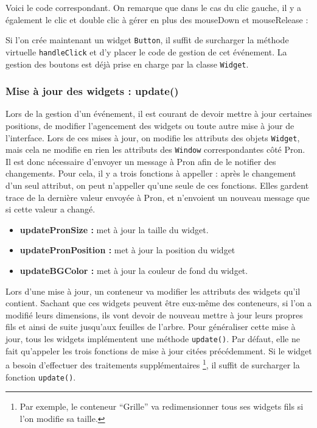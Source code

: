 Voici le code correspondant. On remarque que dans le cas du clic gauche, il y a également le clic et double clic à gérer en plus des mouseDown et mouseRelease :



Si l'on crée maintenant un widget \verb|Button|, il suffit de surcharger la méthode virtuelle \verb|handleClick| et d'y placer le code de gestion de cet événement. La gestion des boutons est déjà prise en charge par la classe \verb|Widget|.

\subsubsection{Mise à jour des widgets : update()}

Lors de la gestion d'un événement, il est courant de devoir mettre à jour certaines positions, de modifier l'agencement des widgets ou toute autre mise à jour de l'interface.
Lors de ces mises à jour, on modifie les attributs des objets \verb|Widget|, mais cela ne modifie en rien les attributs des \verb|Window| correspondantes côté Pron.
Il est donc nécessaire d'envoyer un message à Pron afin de le notifier des changements.
Pour cela, il y a trois fonctions à appeller : après le changement d'un seul attribut, on peut n'appeller qu'une seule de ces fonctions.
Elles gardent trace de la dernière valeur envoyée à Pron, et n'envoient un nouveau message que si cette valeur a changé.

\begin{itemize}
  \item \textbf{updatePronSize :} met à jour la taille du widget.
  \item \textbf{updatePronPosition :} met à jour la position du widget
  \item \textbf{updateBGColor :} met à jour la couleur de fond du widget.
\end{itemize}

Lors d'une mise à jour, un conteneur va modifier les attributs des widgets qu'il contient.
Sachant que ces widgets peuvent être eux-même des conteneurs, si l'on a modifié leurs dimensions, ils vont devoir de nouveau mettre à jour leurs propres fils et ainsi de suite jusqu'aux feuilles de l'arbre.
Pour généraliser cette mise à jour, tous les widgets implémentent une méthode \verb|update()|.
Par défaut, elle ne fait qu'appeler les trois fonctions de mise à jour citées précédemment.
Si le widget a besoin d'effectuer des traitements supplémentaires
\footnote{Par exemple, le conteneur ``Grille'' va redimensionner tous ses widgets fils si l'on modifie sa taille.},
il suffit de surcharger la fonction \verb|update()|.

